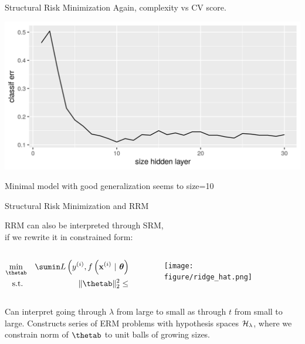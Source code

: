 \documentclass[11pt,compress,t,notes=noshow, xcolor=table]{beamer}
\begin{document}
\begin{frame} {Structural Risk Minimization}
Again, complexity vs CV score. 

\begin{center}\includegraphics[width=\textwidth]{figure/fig-regu-nonlin-srm-2.png}\end{center}

Minimal model with good generalization seems to size=10 

\end{frame}


\begin{frame} {Structural Risk Minimization and RRM}

RRM can also be interpreted through SRM, \\
if we rewrite it in constrained form:

\begin{columns}
\begin{column}{0.5\textwidth}
\begin{eqnarray*}
\min_{\thetab} && \sumin \Lxyit  \\
  \text{s.t. } && \|\thetab\|_2^2  \leq t \\
\end{eqnarray*}
\end{column}
\begin{column}{0.5\textwidth}
\begin{figure}
\texttt{[image: figure/ridge\_hat.png]}
\end{figure}
\end{column}
\end{columns}

\vspace{0.5cm}

Can interpret going through $\lambda$ from large to small as through $t$ from small to large.
Constructs series of ERM problems with hypothesis spaces $\mathcal{H}_\lambda$, 
where we constrain norm of $\thetab$ to unit balls of growing sizes.
\end{frame}


\endlecture
\end{document}

